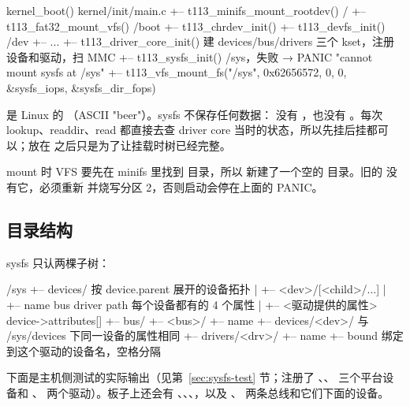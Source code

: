 \begin{txtcode}[basicstyle=\ttfamily\scriptsize]
kernel_boot()                                    kernel/init/main.c
+-- t113_minifs_mount_rootdev()      /
+-- t113_fat32_mount_vfs()           /boot
+-- t113_chrdev_init()
+-- t113_devfs_init()                /dev
+-- ...
+-- t113_driver_core_init()          建 devices/bus/drivers 三个 kset，注册设备和驱动，扫 MMC
+-- t113_sysfs_init()                /sys，失败 → PANIC "cannot mount sysfs at /sys"
    +-- t113_vfs_mount_fs("/sys", 0x62656572, 0, 0, &sysfs_iops, &sysfs_dir_fops)
\end{txtcode}

 是 Linux 的 （ASCII "beer"）。sysfs 不保存任何数据： 没有 ，也没有 。每次 lookup、readdir、read 都直接去查 driver core 当时的状态，所以先挂后挂都可以；放在 之后只是为了让挂载时树已经完整。

mount 时 VFS 要先在 minifs 里找到  目录，所以  新建了一个空的 目录。旧的  没有它，必须重新  并烧写分区 2，否则启动会停在上面的 PANIC。

\subsection{目录结构}\label{sec:sysfs-tree}

sysfs 只认两棵子树：

\begin{txtcode}
/sys
+-- devices/                         按 device.parent 展开的设备拓扑
|   +-- <dev>/[<child>/...]
|       +-- name   bus   driver   path       每个设备都有的 4 个属性
|       +-- <驱动提供的属性>                    device->attributes[]
+-- bus/
    +-- <bus>/
        +-- name
        +-- devices/<dev>/                   与 /sys/devices 下同一设备的属性相同
        +-- drivers/<drv>/
            +-- name
            +-- bound                        绑定到这个驱动的设备名，空格分隔
\end{txtcode}

下面是主机侧测试的实际输出（见第~\ref{sec:sysfs-test} 节；注册了 、、 三个平台设备和 、 两个驱动）。板子上还会有 、、、，以及 、 两条总线和它们下面的设备。

